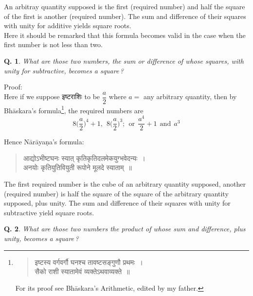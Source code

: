 \documentclass[11pt, openany]{book}
\newtheorem{question}{Q.}
\begin{document}
 An arbitray quantity supposed is the first (required 
number) and half the square of the first is another (required 
number). The sum and difference of their squares with 
unity for additive yields square roots. \\

\vspace{-2mm}
 Here it should be remarked that this formula becomes 
valid in the case when the first number is not less than two. 

\begin{question}
  What are those two numbers, the sum or difference of whose squares, with unity for subtractive, becomes 
a square\,?
\end{question}

\newpage
\noindent Proof:\textemdash\\

\vspace{-2mm}
 Here if we suppose इष्टराशिः to be $\dfrac{a}{2}$ where $a =$ any arbitrary quantity, then by Bhāskara's formula\renewcommand{\thefootnote}{7}\footnote{
\vspace{-4mm}
\begin{quote}
{\color{violet}इष्टस्य वर्गवर्गौ घनश्च तावष्टसङ्गुणौ प्रथमः~। \\
 सैको राशी स्यातामेवं व्यक्तेऽथवाव्यक्ते~॥}
\end{quote}

\hspace{2mm} For its proof see Bhāskara's Arithmetic, edited by my father.}, the required 
numbers are 
\begin{equation*}
    8\bigg(\dfrac{a}{2}\bigg)^{4} + 1,\ ~8\bigg(\dfrac{a}{2}\bigg)^{3} ;\ ~\text{or}\ ~\dfrac{a^{4}}{2} + 1\ ~\text{and}\ ~a^{3}
\end{equation*}

 Hence Nārāyaṇa's formula:\textemdash\ 
\begin{quote}
    \qt 
    आद्योऽभीष्टघनः स्यात् कृतिकृतिदलमेकयुग्भवेदन्यः~। \\
 अनयोः कृतियुतिवियुती रूपोने मूलदे स्याताम्~॥~
\end{quote}
 
 The first required number is the cube of an arbitrary 
quantity supposed, another (required number) is half the 
square of the square of the arbitrary quantity supposed, plus 
unity. The sum and difference of their squares with unity 
for subtractive yield square roots. 

\begin{question}
  What are those two numbers the product of 
whose sum and difference, plus unity, becomes a square\,? 
\end{question}
\end{document}
